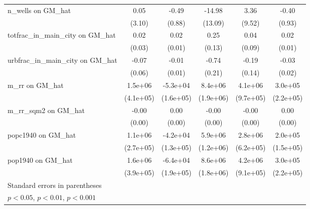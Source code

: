 \begin{table}[htbp]
\begin{tabular}{l*{5}{c}}
\addlinespace
n\_wells on GM\_hat&     0.05         &    -0.49         &   -14.98         &     3.36         &    -0.40         \\
                &   (3.10)         &   (0.88)         &  (13.09)         &   (9.52)         &   (0.93)         \\
\addlinespace
totfrac\_in\_main\_city on GM\_hat&     0.02         &     0.02\sym{*}  &     0.25         &     0.04         &     0.02\sym{*}  \\
                &   (0.03)         &   (0.01)         &   (0.13)         &   (0.09)         &   (0.01)         \\
\addlinespace
urbfrac\_in\_main\_city on GM\_hat&    -0.07         &    -0.01         &    -0.74\sym{***}&    -0.19         &    -0.03         \\
                &   (0.06)         &   (0.01)         &   (0.21)         &   (0.14)         &   (0.02)         \\
\addlinespace
m\_rr on GM\_hat  &  1.5e+06\sym{***}& -5.3e+04         &  8.4e+06\sym{***}&  4.1e+06\sym{***}&  3.0e+05         \\
                &(4.1e+05)         &(1.6e+05)         &(1.9e+06)         &(9.7e+05)         &(2.2e+05)         \\
\addlinespace
m\_rr\_sqm2 on GM\_hat&    -0.00\sym{*}  &     0.00\sym{***}&    -0.00         &    -0.00\sym{*}  &     0.00         \\
                &   (0.00)         &   (0.00)         &   (0.00)         &   (0.00)         &   (0.00)         \\
\addlinespace
popc1940 on GM\_hat&  1.1e+06\sym{***}& -4.2e+04         &  5.9e+06\sym{***}&  2.8e+06\sym{***}&  2.0e+05         \\
                &(2.7e+05)         &(1.3e+05)         &(1.2e+06)         &(6.2e+05)         &(1.5e+05)         \\
\addlinespace
pop1940 on GM\_hat&  1.6e+06\sym{***}& -6.4e+04         &  8.6e+06\sym{***}&  4.2e+06\sym{***}&  3.0e+05         \\
                &(3.9e+05)         &(1.9e+05)         &(1.8e+06)         &(9.1e+05)         &(2.2e+05)         \\
\bottomrule
\multicolumn{6}{l}{\footnotesize Standard errors in parentheses}\\
\multicolumn{6}{l}{\footnotesize \sym{*} \(p<0.05\), \sym{**} \(p<0.01\), \sym{***} \(p<0.001\)}\\
\end{tabular}
\end{table}
